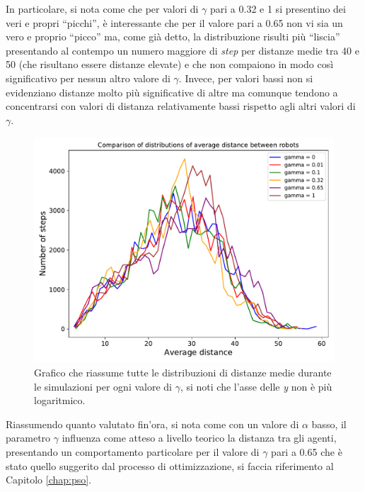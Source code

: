 In particolare, si nota come che per valori di $\gamma$ pari a 0.32 e 1 si presentino dei veri e propri “picchi”, è interessante che per il valore pari a 0.65 non vi sia un vero e proprio “picco” ma, come già detto, la distribuzione risulti più “liscia” presentando al contempo un numero maggiore di \textit{step} per distanze medie tra 40 e 50 (che risultano essere distanze elevate) e che non compaiono in modo così significativo per nessun altro valore di $\gamma$.
Invece, per valori bassi non si evidenziano distanze molto più significative di altre ma comunque tendono a concentrarsi con valori di distanza relativamente bassi rispetto agli altri valori di $\gamma$.\\
\begin{figure}
	\centering
	\includegraphics[width=0.9\linewidth]{images/gamma_results/low_alpha/comparison}
	\caption{Grafico che riassume tutte le distribuzioni di distanze medie durante le simulazioni per ogni valore di $\gamma$, si noti che l'asse delle \textit{y} non è più logaritmico.}
	\label{fig:gammaComparison}
\end{figure}
Riassumendo quanto valutato fin'ora, si nota come con un valore di $\alpha$ basso, il parametro $\gamma$ influenza come atteso a livello teorico la distanza tra gli agenti, presentando un comportamento particolare per il valore di $\gamma$ pari a 0.65 che è stato quello suggerito dal processo di ottimizzazione, si faccia riferimento al Capitolo \ref{chap:pso}.

